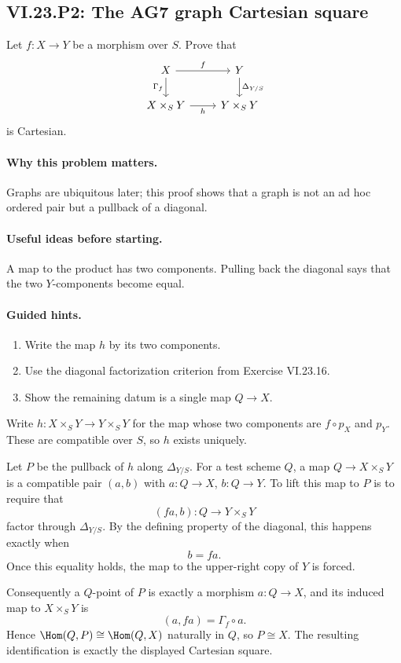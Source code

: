 \subsection*{VI.23.P2: The AG7 graph Cartesian square}
\begin{problem}\label{prob:vi23-p02}
Let $f:X\to Y$ be a morphism over $S$. Prove that
\[
\begin{tikzcd}
X \arrow[r,"f"] \arrow[d,"\Gamma_f"'] & Y \arrow[d,"\Delta_{Y/S}"]\\
X\times_SY \arrow[r,"h"'] & Y\times_SY
\end{tikzcd}
\]
is Cartesian.
\end{problem}

\ifdefined\FullProblemDossiers
\paragraph{Why this problem matters.}
Graphs are ubiquitous later; this proof shows that a graph is not an ad hoc ordered pair but a pullback of a diagonal.

\paragraph{Useful ideas before starting.}
A map to the product has two components.  Pulling back the diagonal says that the two $Y$-components become equal.

\paragraph{Guided hints.}
\begin{enumerate}
\item Write the map $h$ by its two components.
\item Use the diagonal factorization criterion from Exercise VI.23.16.
\item Show the remaining datum is a single map $Q\to X$.
\end{enumerate}

\begin{solution}
Write $h:X\times_SY\to Y\times_SY$ for the map whose two components are
$f\circ p_X$ and $p_Y$.  These are compatible over $S$, so $h$ exists uniquely.

Let $P$ be the pullback of $h$ along $\Delta_{Y/S}$.  For a test scheme $Q$, a map
$Q\to X\times_SY$ is a compatible pair $(a,b)$ with $a:Q\to X$, $b:Q\to Y$.  To lift this map to
$P$ is to require that
\[
(fa,b):Q\to Y\times_SY
\]
factor through $\Delta_{Y/S}$.  By the defining property of the diagonal, this happens exactly
when
\[
b=fa.
\]
Once this equality holds, the map to the upper-right copy of $Y$ is forced.

Consequently a $Q$-point of $P$ is exactly a morphism $a:Q\to X$, and its induced map to
$X\times_SY$ is
\[
(a,fa)=\Gamma_f\circ a.
\]
Hence $\Hom(Q,P)\cong\Hom(Q,X)$ naturally in $Q$, so $P\cong X$.  The resulting identification
is exactly the displayed Cartesian square.
\end{solution}

